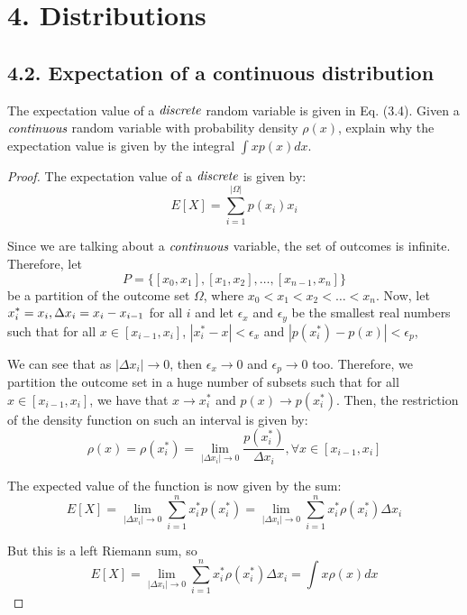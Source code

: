 \chapter*{4. Distributions}

\section*{4.2. Expectation of a continuous distribution}
The expectation value of a $\emph{discrete}$ random variable is 
given in Eq. (3.4). Given a $\emph{continuous}$ random variable with
probability density  $\rho(x)$, explain why the expectation value is
given by the integral $\int{xp(x)}dx$.

\vspace{1em}

\begin{proof}
    The expectation value of a $\emph{discrete}$ is given by:
    \begin{equation*}\tag{3.4}
        E[X] = \sum_{i = 1}^{|\Omega|}p(x_i) x_i
    \end{equation*}

    Since we are talking about a $\emph{continuous}$ variable, 
    the set of outcomes is infinite. Therefore, let 
    \[
        P = \{[x_0, x_1], [x_1, x_2], \ldots, [x_{n - 1}, x_n]\}
    \]
    be a partition of the outcome set $\Omega$, where $x_0 < x_1 < x_2 < \ldots < x_n$. Now, let
    $\displaystyle x_i^* = x_i, \linebreak \Delta x_i = x_i - x_{i-1}$ for all $i$ and 
    let $\epsilon_x$ and $\epsilon_y$ be the smallest real numbers such that for 
    all $x \in [x_{i - 1}, x_i]$, $|x_i^* - x| < \epsilon_x$ and $|p(x_i^*) - p(x)| < \epsilon_p$, 

    We can see that as $|\Delta x_i| \to 0$, then  $\epsilon_x \to 0$ and $\epsilon_p \to 0$ too.
    Therefore, we partition the outcome set in a huge number of subsets
    such that for all $x \in [x_{i - 1}, x_i]$, we have that $x \to x_i^*$
    and $p(x) \to p(x_i^*)$. Then, the restriction of the density function 
    on such an interval is given by:
    \[
        \rho(x) = \rho(x_i^*) = \lim_{|\Delta x_i| \to 0} \frac{p(x_i^*)}{\Delta x_i}, 
        \forall x \in [x_{i - 1}, x_i]
    \] 

    The expected value of the function is now given by the sum:
    \[
        E[X] = \lim_{|\Delta x_i| \to 0}\sum_{i = 1}^{n} x_i^* p(x_i^*)
        = \lim_{|\Delta x_i| \to 0}\sum_{i = 1}^{n} x_i^* \rho(x_i^*) \Delta x_i
    \] 

    But this is a left Riemann sum, so
    \[
        E[X] = \lim_{|\Delta x_i| \to 0}\sum_{i = 1}^{n} x_i^* \rho(x_i^*) \Delta x_i
        = \int x\rho(x) dx
    \] 
\end{proof}

